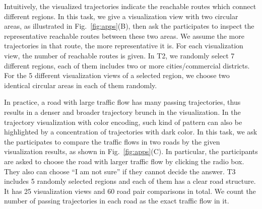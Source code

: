 
Intuitively, the visualized trajectories indicate the reachable routes which connect different regions.
In this task, we give a visualization view with two circular areas, as illustrated in Fig.~\ref{fig:apps}(B),
then ask the participates to inspect the representative reachable routes between these two areas.
We assume the more trajectories in that route, the more representative it is.
For each visualization view, the number of reachable routes is given.
In T2, we randomly select 7 different regions, each of them includes two or more cities/commercial districts.
For the 5 different visualization views of a selected region, we choose two identical circular areas in each of them randomly.


In practice, a road with large traffic flow has many passing trajectories, thus results in a denser and broader trajectory brunch in the visualization.
In the trajectory visualization with color encoding, such kind of pattern can also be highlighted by a concentration of trajectories with {dark} color.
In this task, we ask the participates to compare the traffic flows in two roads by the given visualization results, as shown in Fig.~\ref{fig:apps}(C).
In particular, the participants are asked to choose the road with larger traffic flow by clicking the radio box.
They also can choose ``I am not sure'' if they cannot decide the answer.
T3 includes 5 randomly selected regions and each of them has a clear road structure.
It has 25 visualization views and 60 road pair comparisons in total.
We count the number of passing trajectories in each road as the exact traffic flow in it.




